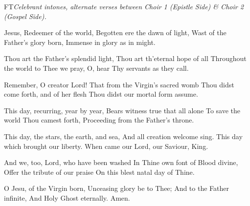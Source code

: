 \documentclass[letterpaper,12pt]{book} %
\def\shouldprintwhointones{F}
\newcommand{\ifprintwhointones}[2]{\if\shouldprintwhointones T#1\else#2\fi}
\begin{document}
{
	\bigskip
	\ifprintwhointones{\noindent\emph{Celebrant intones, alternate verses between Choir 1 (Epistle Side) \& Choir 2 (Gospel Side).}

	}{}
	\begin{multicols}{2}
	\begin{psalmverses}
	{
		\item Jesus, Redeemer of the world,
		Begotten ere the dawn of light,
		Wast of the Father's glory born,
		Immense in glory as in might.

		\item Thou art the Father's splendid light,
		Thou art th'eternal hope of all
		Throughout the world to Thee we pray,
		O, hear Thy servants as they call.

		\item Remember, O creator Lord!
		That from the Virgin's sacred womb
		Thou didst come forth, and of her flesh
		Thou didst our mortal form assume.

		\item This day, recurring, year by year,
		Bears witness true that all alone
		To save the world Thou camest forth,
		Proceeding from the Father's throne.

		\item This day, the stars, the earth, and sea,
		And all creation welcome sing.
		This day which brought our liberty.
		When came our Lord, our Saviour, King.

		\item And we, too, Lord, who have been washed
		In Thine own font of Blood divine,
		Offer the tribute of our praise
		On this blest natal day of Thine.

		\item O Jesu, of the Virgin born,
		Unceasing glory be to Thee;
		And to the Father infinite,
		And Holy Ghost eternally.  Amen.
	}
	\end{psalmverses}
	\end{multicols}
	\smallskip
}

\pagebreak
\def\alwaysrepeatantiphon{T}
{
	
}

{
	
}

{
 	
}

\pagebreak

{}
\end{document}
